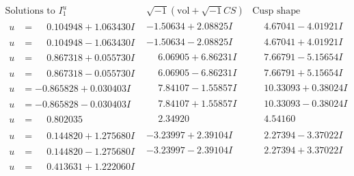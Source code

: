 \documentclass[1p]{elsarticle_modified}
\theoremstyle{definition}
\newcommand{\I}{\sqrt{-1}}
\begin{document}
$$\begin{array}{c|c|c}  
\text{Solutions to }I^u_{1}& \I (\text{vol} + \sqrt{-1}CS) & \text{Cusp shape}\\
 \hline 
\begin{aligned}
u &= \phantom{-}0.104948 + 1.063430 I\end{aligned}
 & -1.50634 + 2.08825 I & \phantom{-}4.67041 - 4.01921 I \\ \hline\begin{aligned}
u &= \phantom{-}0.104948 - 1.063430 I\end{aligned}
 & -1.50634 - 2.08825 I & \phantom{-}4.67041 + 4.01921 I \\ \hline\begin{aligned}
u &= \phantom{-}0.867318 + 0.055730 I\end{aligned}
 & \phantom{-}6.06905 + 6.86231 I & \phantom{-}7.66791 - 5.15654 I \\ \hline\begin{aligned}
u &= \phantom{-}0.867318 - 0.055730 I\end{aligned}
 & \phantom{-}6.06905 - 6.86231 I & \phantom{-}7.66791 + 5.15654 I \\ \hline\begin{aligned}
u &= -0.865828 + 0.030403 I\end{aligned}
 & \phantom{-}7.84107 - 1.55857 I & \phantom{-}10.33093 + 0.38024 I \\ \hline\begin{aligned}
u &= -0.865828 - 0.030403 I\end{aligned}
 & \phantom{-}7.84107 + 1.55857 I & \phantom{-}10.33093 - 0.38024 I \\ \hline\begin{aligned}
u &= \phantom{-}0.802035\phantom{ +0.000000I}\end{aligned}
 & \phantom{-}2.34920\phantom{ +0.000000I} & \phantom{-}4.54160\phantom{ +0.000000I} \\ \hline\begin{aligned}
u &= \phantom{-}0.144820 + 1.275680 I\end{aligned}
 & -3.23997 + 2.39104 I & \phantom{-}2.27394 - 3.37022 I \\ \hline\begin{aligned}
u &= \phantom{-}0.144820 - 1.275680 I\end{aligned}
 & -3.23997 - 2.39104 I & \phantom{-}2.27394 + 3.37022 I \\ \hline\begin{aligned}
u &= \phantom{-}0.413631 + 1.222060 I\end{aligned}

\end{array}$$
\end{document}
